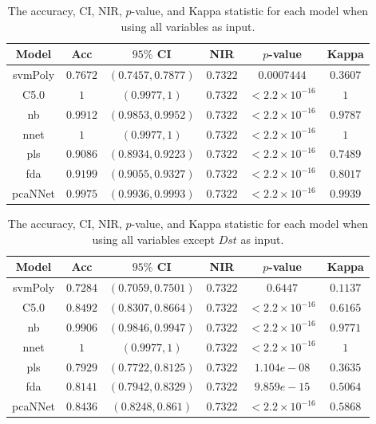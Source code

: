 \documentclass[sn-mathphys-num]{sn-jnl}%
\begin{document}
\begin{table}[!ht]
    \centering
    \caption{The accuracy, CI, NIR, $p$-value, and Kappa statistic for each model when using all variables as input.}
	\label{tab:stats:reverse:all}
	\begin{tabular}{|c|c|c|c|c|c|}
		\hline
		Model & Acc & $95\%$ CI & NIR & $p$-value & Kappa \\ \hline
		svmPoly & $0.7672$ & $(0.7457, 0.7877)$ & $0.7322$ & $0.0007444$ & $0.3607$ \\ \hline
		C5.0 & $1$ & $(0.9977, 1)$ & $0.7322$ & $< 2.2 \times {10}^{-16}$ & $1$ \\ \hline
		nb & $0.9912$ & $(0.9853, 0.9952)$ & $0.7322$ & $< 2.2 \times {10}^{-16}$ & $0.9787$ \\ \hline
		nnet & $1$ & $(0.9977, 1)$ & $0.7322$ & $< 2.2 \times {10}^{-16}$ & $1$ \\ \hline
		pls & $0.9086$ & $(0.8934, 0.9223)$ & $0.7322$ & $< 2.2 \times {10}^{-16}$ & $0.7489$ \\ \hline
		fda & $0.9199$ & $(0.9055, 0.9327)$ & $0.7322$ & $< 2.2 \times {10}^{-16}$ & $0.8017$ \\ \hline
		pcaNNet & $0.9975$ & $(0.9936, 0.9993)$ & $0.7322$ & $< 2.2 \times {10}^{-16}$ & $0.9939$ \\ \hline
	\end{tabular}
\end{table}

\begin{table}[!ht]
    \centering
    \caption{The accuracy, CI, NIR, $p$-value, and Kappa statistic for each model when using all variables except $Dst$ as input.}
	\label{tab:stats:reverse:noDst}
	\begin{tabular}{|c|c|c|c|c|c|}
		\hline
		Model & Acc & $95\%$ CI & NIR & $p$-value & Kappa \\ \hline
		svmPoly & $0.7284$ & $(0.7059, 0.7501)$ & $0.7322$ & $0.6447$ & $0.1137$ \\ \hline
		C5.0 & $0.8492$ & $(0.8307, 0.8664)$ & $0.7322$ & $< 2.2 \times {10}^{-16}$ & $0.6165$ \\ \hline
		nb & $0.9906$ & $(0.9846, 0.9947)$ & $0.7322$ & $< 2.2 \times {10}^{-16}$ & $0.9771$ \\ \hline
		nnet & $1$ & $(0.9977, 1)$ & $0.7322$ & $< 2.2 \times {10}^{-16}$ & $1$ \\ \hline
		pls & $0.7929$ & $(0.7722, 0.8125)$ & $0.7322$ & $1.104e-08$ & $0.3635$ \\ \hline
		fda & $0.8141$ & $(0.7942, 0.8329)$ & $0.7322$ & $9.859e-15$ & $0.5064$ \\ \hline
		pcaNNet & $0.8436$ & $(0.8248, 0.861)$ & $0.7322$ & $< 2.2 \times {10}^{-16}$ & $0.5868$ \\ \hline
	\end{tabular}
\end{table}
\end{document}
